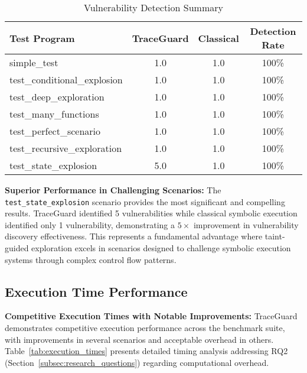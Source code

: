 \begin{table}[htbp]
\centering
\caption{Vulnerability Detection Summary}
\label{tab:detection_results}
\begin{tabular}{lccc}
\toprule
\textbf{Test Program} & \textbf{TraceGuard} & \textbf{Classical} & \textbf{Detection Rate} \\
\midrule
simple\_test & 1.0 & 1.0 & 100\% \\
test\_conditional\_explosion & 1.0 & 1.0 & 100\% \\
test\_deep\_exploration & 1.0 & 1.0 & 100\% \\
test\_many\_functions & 1.0 & 1.0 & 100\% \\
test\_perfect\_scenario & 1.0 & 1.0 & 100\% \\
test\_recursive\_exploration & 1.0 & 1.0 & 100\% \\
test\_state\_explosion & 5.0 & 1.0 & 100\% \\
\bottomrule
\end{tabular}
\end{table}

\textbf{Superior Performance in Challenging Scenarios:} The \texttt{test\_state\_explosion} scenario provides the most significant and compelling results. TraceGuard identified 5 vulnerabilities while classical symbolic execution identified only 1 vulnerability, demonstrating a $5 \times$ improvement in vulnerability discovery effectiveness. This represents a fundamental advantage where taint-guided exploration excels in scenarios designed to challenge symbolic execution systems through complex control flow patterns.

\subsection{Execution Time Performance}

\textbf{Competitive Execution Times with Notable Improvements:} TraceGuard demonstrates competitive execution performance across the benchmark suite, with improvements in several scenarios and acceptable overhead in others. Table~\ref{tab:execution_times} presents detailed timing analysis addressing RQ2 (Section~\ref{subsec:research_questions}) regarding computational overhead.

